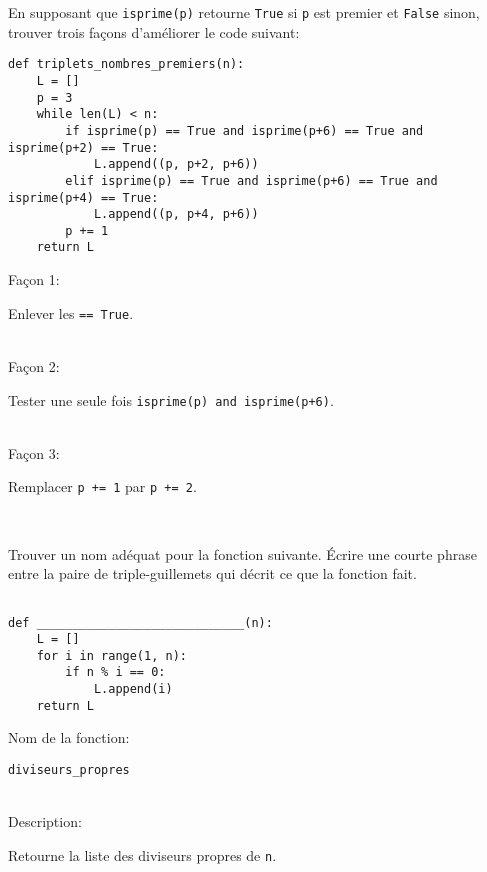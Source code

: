 \begin{question}[5 pts]
    En supposant que \verb|isprime(p)| retourne \verb|True| si \verb|p|
    est premier et \verb|False| sinon,
    trouver trois façons d'améliorer le code suivant:
\begin{verbatim}
def triplets_nombres_premiers(n):
    L = []
    p = 3
    while len(L) < n:
        if isprime(p) == True and isprime(p+6) == True and isprime(p+2) == True:
            L.append((p, p+2, p+6))
        elif isprime(p) == True and isprime(p+6) == True and isprime(p+4) == True:
            L.append((p, p+4, p+6))
        p += 1
    return L
\end{verbatim}
\begin{mybox}
    \vspace{3mm}
    Façon 1:
    \begin{reponse}
	Enlever les \verb|== True|.
    \end{reponse}\\[4mm]
    Façon 2:
    \begin{reponse}
	Tester une seule fois \verb|isprime(p) and isprime(p+6)|.
    \end{reponse}\\[4mm]
    Façon 3:
    \begin{reponse}
	Remplacer \verb|p += 1| par \verb|p += 2|.
    \end{reponse}\\
\end{mybox}
\end{question}

\newpage
\begin{question}[3 pts]
    Trouver un nom adéquat pour la fonction suivante. Écrire une courte phrase
    entre la paire de triple-guillemets qui décrit ce que la fonction fait.
\begin{verbatim}

def _____________________________(n):
    L = []
    for i in range(1, n):
        if n % i == 0:
            L.append(i)
    return L
\end{verbatim}
\begin{mybox}
Nom de la fonction:
\begin{reponse}
\verb|diviseurs_propres|
\end{reponse}\\
Description:
\begin{reponse}
Retourne la liste des diviseurs propres de \verb|n|.
\end{reponse}
\end{mybox}
\end{question}

